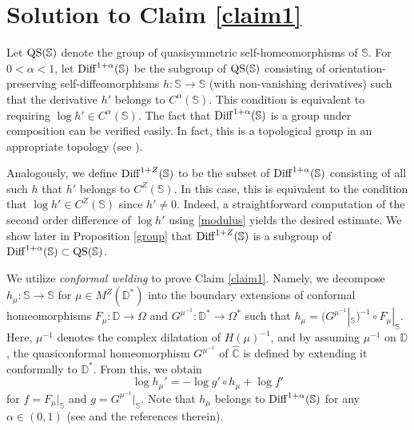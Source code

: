 \documentclass[amstex]{amsart}
\theoremstyle{definition}
\theoremstyle{remark}
\numberwithin{equation}{section}
\begin{document}
\section{Solution to Claim \ref{claim1}}\label{3}

Let ${\rm QS}(\mathbb S)$ denote the group of quasisymmetric 
self-homeo\-morph\-isms of $\mathbb S$. 
For $0<\alpha<1$, let ${\rm Diff}^{1+\alpha}(\mathbb S)$ be the subgroup of ${\rm QS}(\mathbb S)$
consisting of orientation-preserving self-diffeomorphisms $h:\mathbb S \to \mathbb S$ (with non-vanishing derivatives)
such that the derivative $h'$ belongs to $C^\alpha(\mathbb S)$.
This condition is equivalent to requiring $\log h' \in C^\alpha(\mathbb S)$.
The fact that ${\rm Diff}^{1+\alpha}(\mathbb S)$ is a group under composition can be verified easily.
In fact, this is a topological group in an appropriate topology (see \cite[Proposition 5.2]{M1}).

Analogously, we define ${\rm Diff}^{1+Z}(\mathbb S)$ to be the subset of ${\rm Diff}^{1+\alpha}(\mathbb S)$ consisting of all such $h$ that $h'$ belongs to $C^Z(\mathbb S)$.
In this case, this is equivalent to the condition that $\log h' \in C^Z(\mathbb S)$ since $h' \neq 0$.
Indeed, a straightforward computation of the second order difference of $\log h'$
using \eqref{modulus} yields the desired estimate.
We show later in Proposition \ref{group} that ${\rm Diff}^{1+Z}(\mathbb S)$ 
is a subgroup of ${\rm Diff}^{1+\alpha}(\mathbb S) \subset {\rm QS}(\mathbb S)$.

We utilize {\it conformal welding} to prove Claim \ref{claim1}. Namely, we decompose 
$h_\mu:\mathbb S \to \mathbb S$ for
$\mu \in M^Z(\mathbb D^*)$ into
the boundary extensions of conformal homeomorphisms $F_\mu:\mathbb D \to \Omega$ and $G^{\mu^{-1}}:\mathbb D^* \to \Omega^*$
such that $h_{\mu}=(G^{\mu^{-1}}|_{\mathbb S})^{-1} \circ F_\mu|_{\mathbb S}$. 
Here, $\mu^{-1}$ denotes the complex dilatation of $H(\mu)^{-1}$, and by assuming $\mu^{-1}$ on $\mathbb D$,
the quasiconformal homeomorphism $G^{\mu^{-1}}$ of $\widehat{\mathbb C}$ is defined by extending it conformally to $\mathbb D^*$.
From this, we obtain
\begin{equation}\label{log}
\log h_\mu' = -\log g' \circ h_\mu + \log f'
\end{equation}
for $f=F_\mu|_{\mathbb S}$ and $g=G^{\mu^{-1}}|_{\mathbb S}$. 
Note that $h_\mu$ belongs to ${\rm Diff}^{1+\alpha}(\mathbb S)$ for any $\alpha \in (0,1)$ (see \cite[Theorem 6.7]{M1}
and the references therein).
\end{document}

